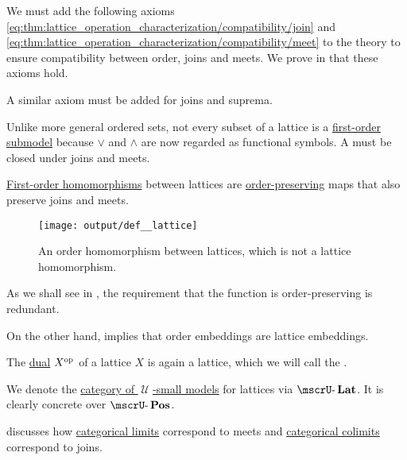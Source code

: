 \begin{definition}
\begin{thmenum}[resume=def:lattice]
    We must add the following axioms \eqref{eq:thm:lattice_operation_characterization/compatibility/join} and \eqref{eq:thm:lattice_operation_characterization/compatibility/meet} to the theory to ensure compatibility between order, joins and meets. We prove in  that these axioms hold.

    A similar axiom must be added for joins and suprema.

     Unlike more general ordered sets, not every subset of a lattice is a \hyperref[def:first_order_submodel]{first-order submodel} because \( \vee \) and \( \wedge \) are now regarded as functional symbols. A  must be closed under joins and meets.

     \hyperref[def:first_order_homomorphism]{First-order homomorphisms} between lattices are \hyperref[def:order_function/preserving]{order-preserving} maps that also preserve joins and meets.

    \begin{figure}[!ht]
      \centering
      \texttt{[image: output/def\_\_lattice]}
      \caption{An order homomorphism between lattices, which is not a lattice homomorphism.}
      \label{fig:def:lattice/homomorphism/order_homomorphism_not_lattice_homomorrphism}
    \end{figure}

    As we shall see in , the requirement that the function is order-preserving is redundant.

    On the other hand,  implies that order embeddings are lattice embeddings.

     The \hyperref[def:preordered_set/opposite]{dual} \( X^{\operatorname{op}} \) of a lattice \( X \) is again a lattice, which we will call the .

     We denote the \hyperref[def:category_of_small_first_order_models]{category of \( \mscrU \)-small models} for lattices via \( \ucat{Lat} \). It is clearly concrete over \hyperref[def:partially_ordered_set]{\( \ucat{Pos} \)}.

     discusses how \hyperref[def:category_of_cones/limit]{categorical limits} correspond to meets and \hyperref[def:category_of_cones/colimit]{categorical colimits} correspond to joins.
  \end{thmenum}
\end{definition}

